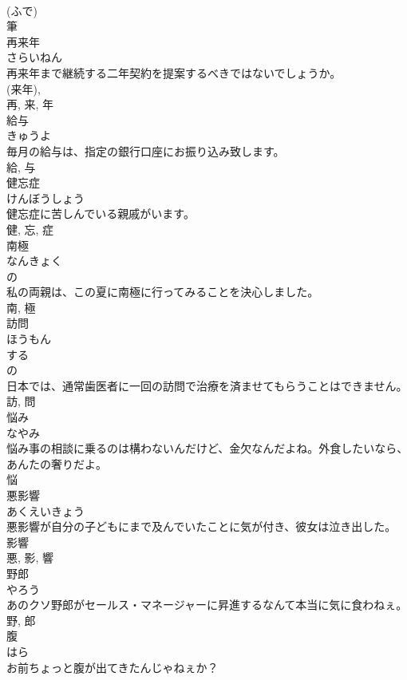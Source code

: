 \documentclass[8pt]{extreport}
\begin{document}
\begin{CJK}{UTF8}{min}
\\	(ふで) 
\\	筆	
\\	再来年	
\\	さらいねん	
\\	再来年まで継続する二年契約を提案するべきではないでしょうか。	
\\	(来年), 
\\	再, 来, 年	
\\	給与	
\\	きゅうよ	
\\	毎月の給与は、指定の銀行口座にお振り込み致します。	
\\	給, 与	
\\	健忘症	
\\	けんぼうしょう	
\\	健忘症に苦しんでいる親戚がいます。	
\\	健, 忘, 症	
\\	南極	
\\	なんきょく	
\\	の 
\\	私の両親は、この夏に南極に行ってみることを決心しました。	
\\	南, 極	
\\	訪問	
\\	ほうもん	
\\	する 
\\	の 
\\	日本では、通常歯医者に一回の訪問で治療を済ませてもらうことはできません。	
\\	訪, 問	
\\	悩み	
\\	なやみ	
\\	悩み事の相談に乗るのは構わないんだけど、金欠なんだよね。外食したいなら、あんたの奢りだよ。	
\\	悩	
\\	悪影響	
\\	あくえいきょう	
\\	悪影響が自分の子どもにまで及んでいたことに気が付き、彼女は泣き出した。	
\\	影響 
\\	悪, 影, 響	
\\	野郎	
\\	やろう	
\\	あのクソ野郎がセールス・マネージャーに昇進するなんて本当に気に食わねぇ。	
\\	野, 郎	
\\	腹	
\\	はら	
\\	お前ちょっと腹が出てきたんじゃねぇか？	

\end{CJK}
\end{document}
